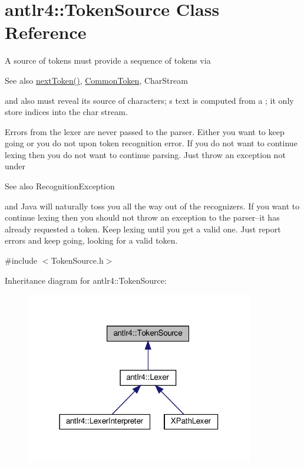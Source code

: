 \hypertarget{classantlr4_1_1TokenSource}{}\section{antlr4\+:\+:Token\+Source Class Reference}
\label{classantlr4_1_1TokenSource}


A source of tokens must provide a sequence of tokens via \begin{DoxySeeAlso}{See also}
\hyperlink{classantlr4_1_1TokenSource_a41e3a36074ba6dcd3e0dab9250d4b179}{next\+Token()}, \hyperlink{classantlr4_1_1CommonToken}{Common\+Token}, Char\+Stream


\end{DoxySeeAlso}
and also must reveal it\textquotesingle{}s source of characters; \textquotesingle{}s text is computed from a ; it only store indices into the char stream. 

Errors from the lexer are never passed to the parser. Either you want to keep going or you do not upon token recognition error. If you do not want to continue lexing then you do not want to continue parsing. Just throw an exception not under \begin{DoxySeeAlso}{See also}
Recognition\+Exception


\end{DoxySeeAlso}
and Java will naturally toss you all the way out of the recognizers. If you want to continue lexing then you should not throw an exception to the parser--it has already requested a token. Keep lexing until you get a valid one. Just report errors and keep going, looking for a valid token.  




{\ttfamily \#include $<$Token\+Source.\+h$>$}



Inheritance diagram for antlr4\+:\+:Token\+Source\+:
\nopagebreak
\begin{figure}[H]
\begin{center}
\leavevmode
\includegraphics[width=282pt]{classantlr4_1_1TokenSource__inherit__graph}
\end{center}
\end{figure}
